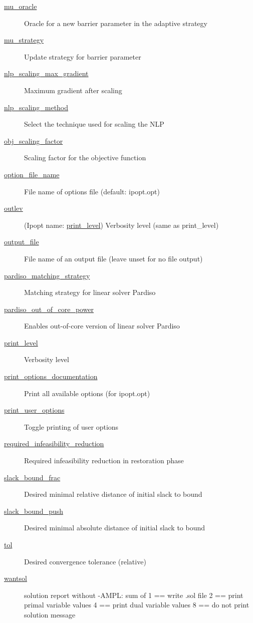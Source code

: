 \begin{description}
\item[{\hyperref[sec:mu_oracle]{mu\_oracle}}] Oracle for a new barrier parameter in the adaptive strategy
\item[{\hyperref[sec:mu_strategy]{mu\_strategy}}] Update strategy for barrier parameter
\item[{\hyperref[sec:nlp_scaling_max_gradient]{nlp\_scaling\_max\_gradient}}] Maximum gradient after scaling
\item[{\hyperref[sec:nlp_scaling_method]{nlp\_scaling\_method}}] Select the technique used for scaling the NLP
\item[{\hyperref[sec:obj_scaling_factor]{obj\_scaling\_factor}}] Scaling factor for the objective function
\item[{\hyperref[sec:option_file_name]{option\_file\_name}}] File name of options file (default: ipopt.opt)
\item[{\hyperref[sec:print_level]{outlev}}] (Ipopt name: \hyperref[sec:print_level]{print\_level}) Verbosity level (same as print\_level)
\item[{\hyperref[sec:output_file]{output\_file}}] File name of an output file (leave unset for no file output)
\item[{\hyperref[sec:pardiso_matching_strategy]{pardiso\_matching\_strategy}}] Matching strategy for linear solver Pardiso
\item[{\hyperref[sec:pardiso_out_of_core_power]{pardiso\_out\_of\_core\_power}}] Enables out-of-core version of linear solver Pardiso
\item[{\hyperref[sec:print_level]{print\_level}}] Verbosity level
\item[{\hyperref[sec:print_options_documentation]{print\_options\_documentation}}] Print all available options (for ipopt.opt)
\item[{\hyperref[sec:print_user_options]{print\_user\_options}}] Toggle printing of user options
\item[{\hyperref[sec:required_infeasibility_reduction]{required\_infeasibility\_reduction}}] Required infeasibility reduction in restoration phase
\item[{\hyperref[sec:slack_bound_frac]{slack\_bound\_frac}}] Desired minimal relative distance of initial slack to bound
\item[{\hyperref[sec:slack_bound_push]{slack\_bound\_push}}] Desired minimal absolute distance of initial slack to bound
\item[{\hyperref[sec:tol]{tol}}] Desired convergence tolerance (relative)
\item[{\hyperref[sec:]{wantsol}}] solution report without -AMPL: sum of 		1 == write .sol file 		2 == print primal variable values 		4 == print dual variable values 		8 == do not print solution message

\end{description}
